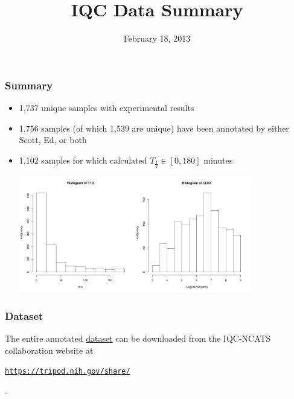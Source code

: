 \documentclass{beamer}
\title{IQC Data Summary}
\date[]%
{February 18, 2013}
\begin{document}
\begin{frame}
  \titlepage
\end{frame}

\begin{frame}
\frametitle{Summary}
\begin{itemize}
\item 1,737 unique samples with experimental results 
\item 1,756 samples (of which 1,539 are unique) have been
  annotated by either Scott, Ed, or both
\item 1,102 samples for which calculated $T_\frac{1}{2} \in[0, 180]$
  minutes 
\centerline{\includegraphics[height=2in]{t12}\includegraphics[height=2in]{clint}}
\end{itemize}
\end{frame}

\begin{frame}
\frametitle{Dataset}
The entire annotated
\href{https://tripod.nih.gov/share/page/site/iqc-ncats/document-details?nodeRef=workspace://SpacesStore/fafbd72e-922f-466a-94df-c599902f61bb}{\color{blue}dataset}
can be downloaded from the IQC-NCATS collaboration website at
\centerline{\href{https://tripod.nih.gov/share/}{\texttt{https://tripod.nih.gov/share/}}}.
\end{frame}
\end{document}
